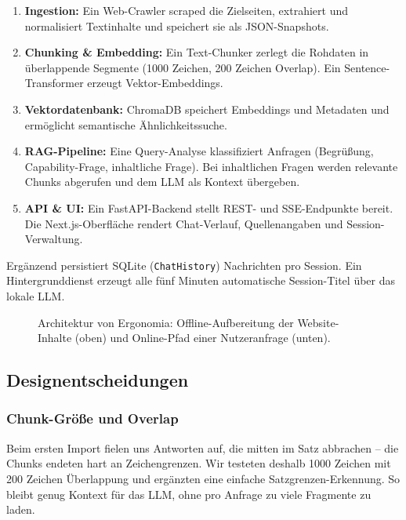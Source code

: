 \begin{enumerate}
    \item \textbf{Ingestion:} Ein Web-Crawler scraped die Zielseiten, extrahiert und normalisiert Textinhalte und speichert sie als JSON-Snapshots.
    \item \textbf{Chunking \& Embedding:} Ein Text-Chunker zerlegt die Rohdaten in überlappende Segmente (1000 Zeichen, 200 Zeichen Overlap). Ein Sentence-Transformer erzeugt Vektor-Embeddings.
    \item \textbf{Vektordatenbank:} ChromaDB speichert Embeddings und Metadaten und ermöglicht semantische Ähnlichkeitssuche.
    \item \textbf{RAG-Pipeline:} Eine Query-Analyse klassifiziert Anfragen (Begrüßung, Capability-Frage, inhaltliche Frage). Bei inhaltlichen Fragen werden relevante Chunks abgerufen und dem LLM als Kontext übergeben.
    \item \textbf{API \& UI:} Ein FastAPI-Backend stellt REST- und SSE-Endpunkte bereit. Die Next.js-Oberfläche rendert Chat-Verlauf, Quellenangaben und Session-Verwaltung.
\end{enumerate}

Ergänzend persistiert SQLite (\texttt{ChatHistory}) Nachrichten pro Session. Ein Hintergrunddienst erzeugt alle fünf Minuten automatische Session-Titel über das lokale LLM.

\begin{figure}[htbp]
    \centering
    \resizebox{\textwidth}{!}{}
    \caption{Architektur von Ergonomia: Offline-Aufbereitung der Website-Inhalte (oben) und Online-Pfad einer Nutzeranfrage (unten).}
    \label{fig:architecture}
\end{figure}

\subsection{Designentscheidungen}

\subsubsection{Chunk-Größe und Overlap}

Beim ersten Import fielen uns Antworten auf, die mitten im Satz abbrachen -- die Chunks endeten hart an Zeichengrenzen. Wir testeten deshalb 1000 Zeichen mit 200 Zeichen Überlappung und ergänzten eine einfache Satzgrenzen-Erkennung. So bleibt genug Kontext für das LLM, ohne pro Anfrage zu viele Fragmente zu laden.

